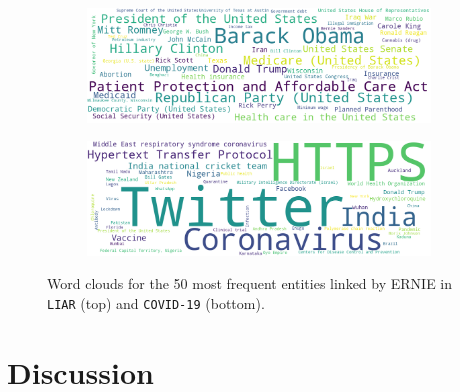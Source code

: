 \documentclass[letterpaper]{article} %
\begin{document}
\begin{figure}
\centering
\begin{subfigure}[b]{0.46\textwidth}
\centering
\includegraphics[width=\textwidth]{imgs/liar50.png}
\label{fig:e1}
\end{subfigure}
\hfill
\begin{subfigure}[b]{0.46\textwidth}

\includegraphics[width=\textwidth]{imgs/covid50.png}
\label{fig:e2}
\end{subfigure}
\caption{Word clouds for the 50 most frequent entities linked by ERNIE in  \texttt{LIAR} (top) and  \texttt{COVID-19} (bottom).}
\label{fig:word_cloud_Ernie}
\end{figure}



\section{Discussion}
\end{document}
